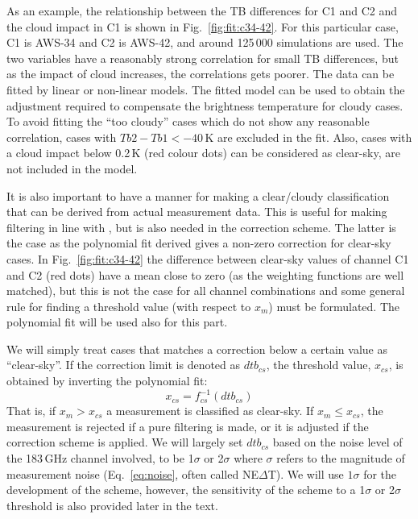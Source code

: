 \documentclass[12pt]{article}
\begin{document}
As an example, the relationship between the TB differences for C1 and C2 and
the cloud impact in C1 is shown in Fig.~\ref{fig:fit:c34-42}. For this
particular case, C1 is AWS-34 and C2 is AWS-42, and around 125\,000 simulations
are used. The two variables have a reasonably strong correlation for small TB
differences, but as the impact of cloud increases, the correlations gets
poorer. The data can be fitted by linear or non-linear models. The fitted model
can be used to obtain the adjustment required to compensate the brightness
temperature for cloudy cases. To avoid fitting the ``too cloudy'' cases which
do not show any reasonable correlation, cases with $Tb2-Tb1< -40$\,K are
excluded in the fit. Also, cases with a cloud impact below 0.2\,K (red colour
dots) can be considered as clear-sky, are not included in the model.

It is also important to have a manner for making a clear/cloudy classification
that can be derived from actual measurement data. This is useful for making
filtering in line with \citet{rekha2012potential}, but is also needed in the
correction scheme. The latter is the case as the polynomial fit derived gives a
non-zero correction for clear-sky cases. In Fig.~\ref{fig:fit:c34-42} the
difference between clear-sky values of channel C1 and C2 (red dots) have a mean
close to zero (as the weighting functions are well matched), but this is not
the case for all channel combinations and some general rule for finding a
threshold value (with respect to $x_m$) must be formulated. The polynomial fit
will be used also for this part.

We will simply treat cases that matches a correction below a certain value as
``clear-sky''. If the correction limit is denoted as $dtb_{cs}$, the threshold
value, $x_{cs}$, is obtained by inverting the polynomial fit:
\begin{equation}
x_{cs} = f_{cs}^{-1}(dtb_{cs}) 
\label{eq:dtb}
\end{equation}
That is, if $x_m>x_{cs}$ a measurement is classified as clear-sky. If
$x_m\leq x_{cs}$, the measurement is rejected if a pure filtering is made, or
it is adjusted if the correction scheme is applied. We will largely set
$dtb_{cs}$ based on the noise level of the 183\,GHz channel involved, to be
1$\sigma$ or 2$\sigma$ where $\sigma$ refers to the magnitude of measurement
noise (Eq.~\ref{eq:noise}, often called NE$\Delta$T). We will use $1\sigma$ for
the development of the scheme, however, the sensitivity of the scheme to
a 1$\sigma$ or 2$\sigma$ threshold is also provided later in the text.
\end{document}
